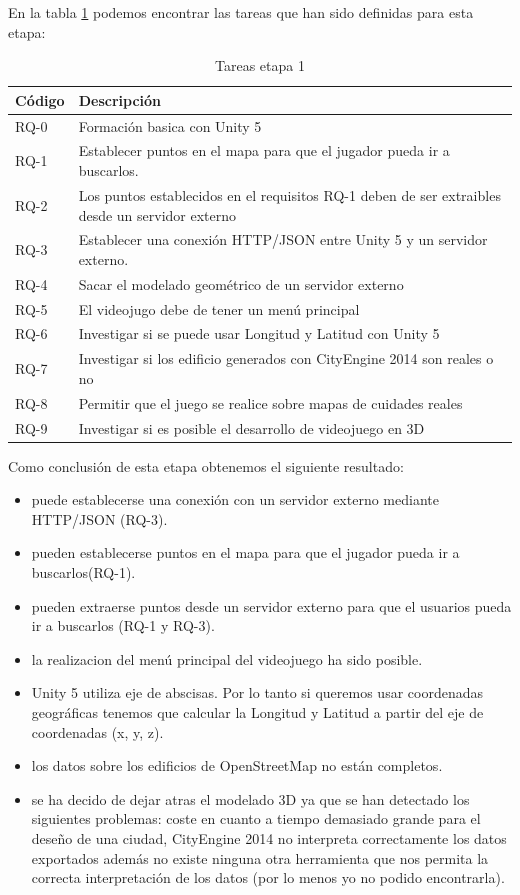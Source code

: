 En la tabla \ref{tabla:requisitosEtapa1} podemos encontrar las tareas que han sido definidas para esta etapa:

\begin{table}[H]
\begin{center}
\begin{tabular}{|p{1.5cm}| p{10.5cm}|}
\hline 
Código & Descripción \\
\hline \hline
RQ-0  & Formación basica con Unity 5\\ \hline
RQ-1  & Establecer puntos en el mapa para que el jugador pueda ir a buscarlos. \\ \hline
RQ-2  & Los puntos establecidos en el requisitos RQ-1 deben de ser extraibles desde un servidor externo\\ \hline
RQ-3  & Establecer una conexión HTTP/JSON entre Unity 5 y un servidor externo. \\ \hline
RQ-4  & Sacar el modelado geométrico de un servidor externo \\ \hline
RQ-5  & El videojugo debe de tener un menú principal \\ \hline
RQ-6  & Investigar si se puede usar Longitud y Latitud con Unity 5 \\ \hline
RQ-7  & Investigar si los edificio generados con CityEngine 2014 son reales o no \\ \hline
RQ-8  & Permitir que el juego se realice sobre mapas de cuidades reales \\ \hline
RQ-9  & Investigar si es posible el desarrollo de videojuego en 3D \\ \hline
\end{tabular}
\caption{Tareas etapa 1}
\label{tabla:requisitosEtapa1}
\end{center}
\end{table}

Como conclusión de esta etapa obtenemos el siguiente resultado:
\begin{itemize}
	\item puede establecerse una conexión con un servidor externo mediante HTTP/JSON (RQ-3). 
	\item pueden establecerse puntos en el mapa para que el jugador pueda ir a buscarlos(RQ-1). 
	\item pueden extraerse puntos desde un servidor externo para que el usuarios pueda ir a buscarlos (RQ-1 y RQ-3).
	\item la realizacion del menú principal del videojuego ha sido posible.
	\item Unity 5 utiliza eje de abscisas. Por lo tanto si queremos usar coordenadas geográficas tenemos que calcular la Longitud y Latitud a partir del eje de coordenadas (x, y, z).
	\item los datos sobre los edificios de OpenStreetMap no están completos.
	\item se ha decido de dejar atras el modelado 3D ya que se han detectado los siguientes problemas: coste en cuanto a tiempo demasiado grande para el deseño de una ciudad, CityEngine 2014 no interpreta correctamente los datos exportados además no existe ninguna otra herramienta que nos permita la correcta interpretación de los datos (por lo menos yo no podido encontrarla).
\end{itemize}

